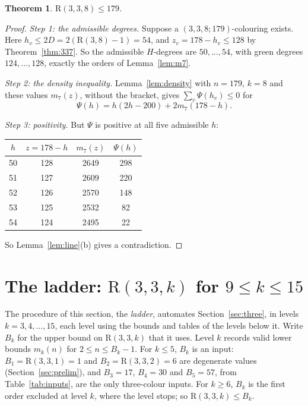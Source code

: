 \documentclass[11pt]{article}
\theoremstyle{spacedplain}
\newtheorem{theorem}{Theorem}[section]
\theoremstyle{spaceddef}
\theoremstyle{spacedremark}
\newcommand{\R}{\mathrm{R}}
\begin{document}
\begin{theorem}\label{thm:338}
$\R(3,3,8)\le 179$.
\end{theorem}

\begin{proof}
\emph{Step 1: the admissible degrees.}
Suppose a $(3,3,8;179)$-colouring exists.
Here $h_v\le 2D=2(\R(3,8)-1)=54$, and $z_v=178-h_v\le 128$ by Theorem~\ref{thm:337}.
So the admissible $H$-degrees are $50,\dots,54$, with green degrees $124,\dots,128$, exactly the orders of Lemma~\ref{lem:m7}.

\emph{Step 2: the density inequality.}
Lemma~\ref{lem:density} with $n=179$, $k=8$ and these values $m_7(z)$, without the bracket, gives $\sum_v\Psi(h_v)\le 0$ for
\[
\Psi(h)=h(2h-200)+2m_7(178-h).
\]

\emph{Step 3: positivity.}
But $\Psi$ is positive at all five admissible $h$:
\begin{center}
\begin{tabular}{cccc}
\toprule
$h$ & $z=178-h$ & $m_7(z)$ & $\Psi(h)$\\
\midrule
50&128&2649&298\\ 51&127&2609&220\\ 52&126&2570&148\\ 53&125&2532&82\\ 54&124&2495&22\\
\bottomrule
\end{tabular}
\end{center}
So Lemma~\ref{lem:line}(b) gives a contradiction.
\end{proof}

\section{The ladder: \texorpdfstring{$\R(3,3,k)$}{R(3,3,k)} for \texorpdfstring{$9\le k\le 15$}{9 <= k <= 15}}\label{sec:ladder}

The procedure of this section, the \emph{ladder}, automates Section~\ref{sec:three}, in levels $k=3,4,\dots,15$, each level using the bounds and tables of the levels below it.
Write $B_k$ for the upper bound on $\R(3,3,k)$ that it uses.
Level $k$ records valid lower bounds $m_k(n)$ for $2\le n\le B_k-1$.
For $k\le 5$, $B_k$ is an input: $B_1=\R(3,3,1)=1$ and $B_2=\R(3,3,2)=6$ are degenerate values (Section~\ref{sec:prelim}), and $B_3=17$, $B_4=30$ and $B_5=57$, from Table~\ref{tab:inputs}, are the only three-colour inputs.
For $k\ge 6$, $B_k$ is the first order excluded at level $k$, where the level stops; so $\R(3,3,k)\le B_k$.
\end{document}
